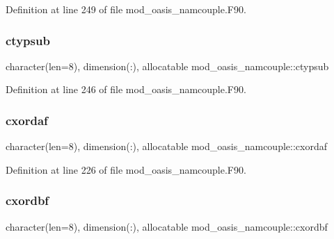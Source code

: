 Definition at line 249 of file mod\+\_\+oasis\+\_\+namcouple.\+F90.

\mbox{\label{namespacemod__oasis__namcouple_ad8f8aca3a6fa885e4edf027b79a93305}} 
\subsubsection{\texorpdfstring{ctypsub}{ctypsub}}
{\footnotesize\ttfamily character(len=8), dimension(\+:), allocatable mod\+\_\+oasis\+\_\+namcouple\+::ctypsub\hspace{0.3cm}{\ttfamily [private]}}



Definition at line 246 of file mod\+\_\+oasis\+\_\+namcouple.\+F90.

\mbox{\label{namespacemod__oasis__namcouple_ab52bc27bf5898cc85dce0fc60feb9320}} 
\subsubsection{\texorpdfstring{cxordaf}{cxordaf}}
{\footnotesize\ttfamily character(len=8), dimension(\+:), allocatable mod\+\_\+oasis\+\_\+namcouple\+::cxordaf\hspace{0.3cm}{\ttfamily [private]}}



Definition at line 226 of file mod\+\_\+oasis\+\_\+namcouple.\+F90.

\mbox{\label{namespacemod__oasis__namcouple_a2ee5f8ec71ebae64c3d14445345d7545}} 
\subsubsection{\texorpdfstring{cxordbf}{cxordbf}}
{\footnotesize\ttfamily character(len=8), dimension(\+:), allocatable mod\+\_\+oasis\+\_\+namcouple\+::cxordbf\hspace{0.3cm}{\ttfamily [private]}}



